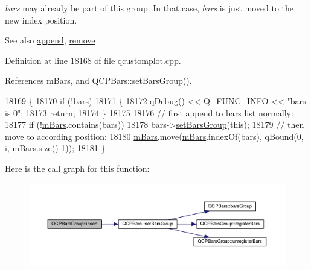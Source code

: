 {\itshape bars} may already be part of this group. In that case, {\itshape bars} is just moved to the new index position.

\begin{DoxySeeAlso}{See also}
\hyperlink{class_q_c_p_bars_group_a809ed63cc4ff7cd5b0b8c96b470163d3}{append}, \hyperlink{class_q_c_p_bars_group_a215e28a5944f1159013a0e19169220e7}{remove} 
\end{DoxySeeAlso}


Definition at line 18168 of file qcustomplot.\+cpp.



References m\+Bars, and Q\+C\+P\+Bars\+::set\+Bars\+Group().


\begin{DoxyCode}
18169 \{
18170   \textcolor{keywordflow}{if} (!bars)
18171   \{
18172     qDebug() << Q\_FUNC\_INFO << \textcolor{stringliteral}{"bars is 0"};
18173     \textcolor{keywordflow}{return};
18174   \}
18175   
18176   \textcolor{comment}{// first append to bars list normally:}
18177   \textcolor{keywordflow}{if} (!\hyperlink{class_q_c_p_bars_group_affdb1e9233c277ff5a4c0a1121cf1fc0}{mBars}.contains(bars))
18178     bars->\hyperlink{class_q_c_p_bars_aedd1709061f0b307c47ddb45e172ef9a}{setBarsGroup}(\textcolor{keyword}{this});
18179   \textcolor{comment}{// then move to according position:}
18180   \hyperlink{class_q_c_p_bars_group_affdb1e9233c277ff5a4c0a1121cf1fc0}{mBars}.move(\hyperlink{class_q_c_p_bars_group_affdb1e9233c277ff5a4c0a1121cf1fc0}{mBars}.indexOf(bars), qBound(0, \hyperlink{_comparision_pictures_2_createtest_image_8m_a6f6ccfcf58b31cb6412107d9d5281426}{i}, \hyperlink{class_q_c_p_bars_group_affdb1e9233c277ff5a4c0a1121cf1fc0}{mBars}.size()-1));
18181 \}
\end{DoxyCode}


Here is the call graph for this function\+:\nopagebreak
\begin{figure}[H]
\begin{center}
\leavevmode
\includegraphics[width=350pt]{class_q_c_p_bars_group_a309a5f7233db189f3ea9c2d04ece6c13_cgraph}
\end{center}
\end{figure}


